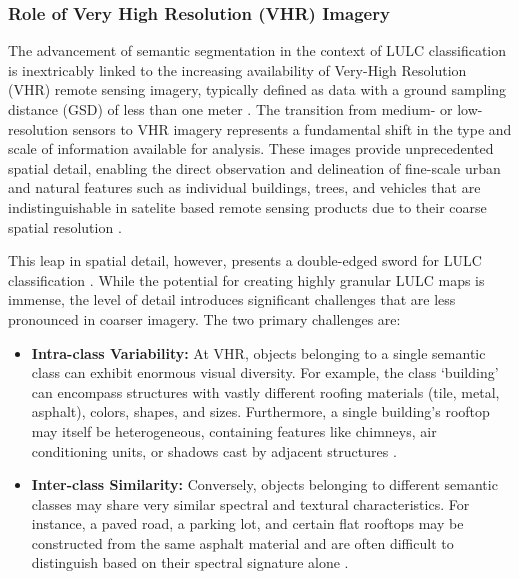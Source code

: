 \documentclass{report}
\begin{document}
\subsubsection{Role of Very High Resolution (VHR) Imagery}
The advancement of semantic segmentation in the context of LULC classification is inextricably linked to the increasing availability of Very-High Resolution (VHR) remote sensing imagery, typically defined as data with a ground sampling distance (GSD) of less than one meter \parencites[p.~2;]{NeupaneEtAlDeepLearningBasedSemanticSegmentationUrbanFeaturesSatelliteImagesReviewMetaAnalysis2021}[p.~3147]{XuEtAlsemanticsegmentationmethodcategoryboundaryLandUseLandCoverLULCmappingVeryHighResolutionVHRremotesensingimage2021}. The transition from medium- or low-resolution sensors to VHR imagery represents a fundamental shift in the type and scale of information available for analysis. These images provide unprecedented spatial detail, enabling the direct observation and delineation of fine-scale urban and natural features such as individual buildings, trees, and vehicles that are indistinguishable in satelite based remote sensing products due to their coarse spatial resolution \parencites[p.~3147]{XuEtAlsemanticsegmentationmethodcategoryboundaryLandUseLandCoverLULCmappingVeryHighResolutionVHRremotesensingimage2021}. \par
This leap in spatial detail, however, presents a double-edged sword for LULC classification \parencites[p.~2]{NeupaneEtAlDeepLearningBasedSemanticSegmentationUrbanFeaturesSatelliteImagesReviewMetaAnalysis2021}. While the potential for creating highly granular LULC maps is immense, the level of detail introduces significant challenges that are less pronounced in coarser imagery. The two primary challenges are:
\begin{itemize}
\item \textbf{Intra-class Variability:} At VHR, objects belonging to a single semantic class can exhibit enormous visual diversity. For example, the class ‘building’ can encompass structures with vastly different roofing materials (tile, metal, asphalt), colors, shapes, and sizes. Furthermore, a single building's rooftop may itself be heterogeneous, containing features like chimneys, air conditioning units, or shadows cast by adjacent structures \parencites[p.~2;]{NeupaneEtAlDeepLearningBasedSemanticSegmentationUrbanFeaturesSatelliteImagesReviewMetaAnalysis2021}[p.~2]{SertelEtAlLandUseLandCoverMappingUsingDeepLearningBasedSegmentationApproachesVHRWorldview3Images2022}.
\item \textbf{Inter-class Similarity:} Conversely, objects belonging to different semantic classes may share very similar spectral and textural characteristics. For instance, a paved road, a parking lot, and certain flat rooftops may be constructed from the same asphalt material and are often difficult to distinguish based on their spectral signature alone \parencites[p.~2]{NeupaneEtAlDeepLearningBasedSemanticSegmentationUrbanFeaturesSatelliteImagesReviewMetaAnalysis2021}.
\end{itemize}
\end{document}
